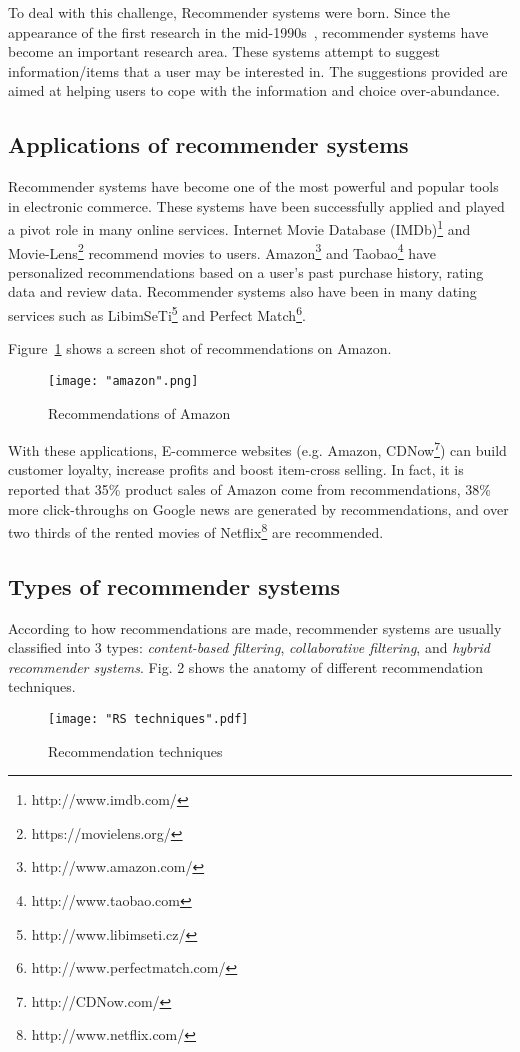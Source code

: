 \documentclass[oneside,13pt]{extreport}
\begin{document}
To deal with this challenge, Recommender systems were born. Since the appearance of the first research in the mid-1990s~\cite{hill1995recommending, resnick1994grouplens, shardanand1995social}, recommender systems have become an important research area. These systems attempt to suggest information/items that a user may be interested in. The suggestions provided are aimed at helping users to cope with the information and choice over-abundance. 

\subsection{Applications of recommender systems}
Recommender systems have become one of the most powerful and popular tools in electronic commerce. These systems have been successfully applied and played a pivot role in many online services.  Internet Movie Database (IMDb)\footnote{http://www.imdb.com/} and Movie-Lens\footnote{https://movielens.org/} recommend movies to users. Amazon\footnote{http://www.amazon.com/} and Taobao\footnote{http://www.taobao.com} have personalized recommendations based on a user’s past purchase history, rating data and review data. Recommender systems also have been  in many dating services such as LibimSeTi\footnote{http://www.libimseti.cz/} and Perfect Match\footnote{http://www.perfectmatch.com/}.

Figure~\ref{fig:amazon} shows a screen shot of recommendations on Amazon.
\clearpage
\begin{figure}[h!]
    \centering
    \texttt{[image: "amazon".png]} 
    \caption{Recommendations of Amazon}
    \label{fig:amazon}
\end{figure}


With these applications, E-commerce websites (e.g. Amazon, CDNow\footnote{http://CDNow.com/}) can build customer loyalty, increase profits and boost item-cross selling. In fact, it is reported that 35\% product sales of Amazon come from recommendations, 38\% more click-throughs on Google news are generated by recommendations, and over two thirds of the rented movies of Netflix\footnote{http://www.netflix.com/} are recommended\cite{chevalier2009collaborative}.


\subsection{Types of recommender systems}
According to how recommendations are made, recommender systems are usually classified into 3 types\cite{adomavicius2005toward, balabanovic1997fab}: \emph{content-based filtering}, \emph{collaborative filtering}, and \emph{hybrid recommender systems}. Fig. 2 shows the anatomy of different recommendation techniques.
\clearpage
\begin{figure}[h!]
\centering
\texttt{[image: "RS techniques".pdf]}
\caption{Recommendation techniques}
\label{fig:RS_techniques}
\end{figure}
\end{document}

